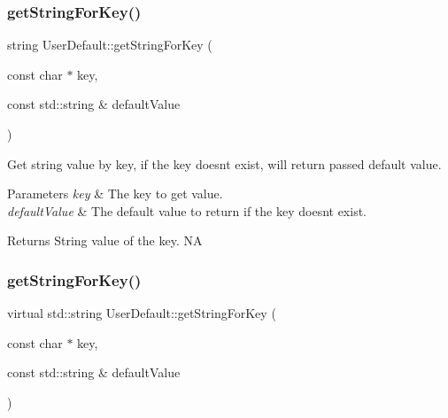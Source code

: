 \subsubsection{\texorpdfstring{get\+String\+For\+Key()}{getStringForKey()}\hspace{0.1cm}{\footnotesize\ttfamily [3/4]}}
{\footnotesize\ttfamily string User\+Default\+::get\+String\+For\+Key (\begin{DoxyParamCaption}\item[{const char $\ast$}]{key,  }\item[{const std\+::string \&}]{default\+Value }\end{DoxyParamCaption})\hspace{0.3cm}{\ttfamily [virtual]}}

Get string value by key, if the key doesn\textquotesingle{}t exist, will return passed default value. 
\begin{DoxyParams}{Parameters}
{\em key} & The key to get value. \\
\hline
{\em default\+Value} & The default value to return if the key doesn\textquotesingle{}t exist. \\
\hline
\end{DoxyParams}
\begin{DoxyReturn}{Returns}
String value of the key.  NA 
\end{DoxyReturn}
\mbox{\label{classUserDefault_ae67d0bfe9e3a515f0f73f5dec4fc320e}} 
\subsubsection{\texorpdfstring{get\+String\+For\+Key()}{getStringForKey()}\hspace{0.1cm}{\footnotesize\ttfamily [4/4]}}
{\footnotesize\ttfamily virtual std\+::string User\+Default\+::get\+String\+For\+Key (\begin{DoxyParamCaption}\item[{const char $\ast$}]{key,  }\item[{const std\+::string \&}]{default\+Value }\end{DoxyParamCaption})\hspace{0.3cm}{\ttfamily [virtual]}}

